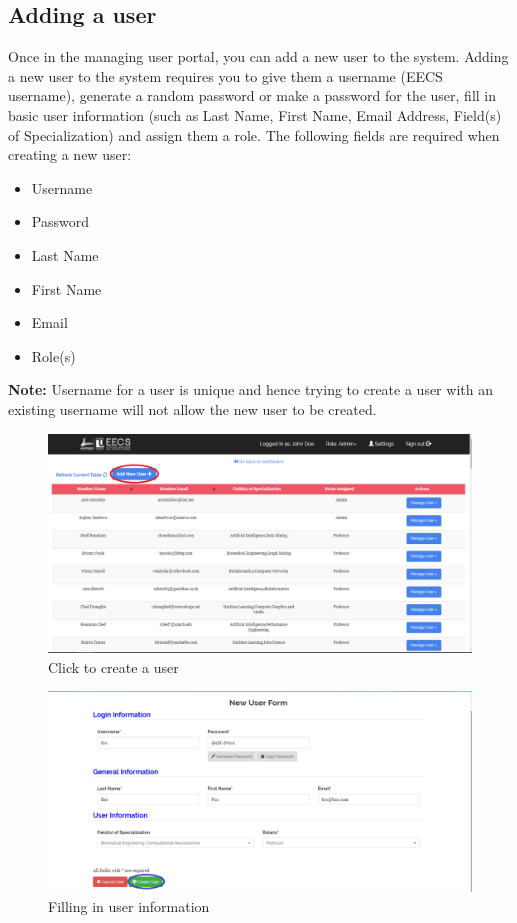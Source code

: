\documentclass[fontsize=12pt,paper=letter,twoside]{scrartcl}
\begin{document}
\subsection{Adding a user}
Once in the managing user portal, you can add a new user to the system. Adding a new user to the system requires you to give them a username (EECS username), generate a random password or make a password for the user, fill in basic user information (such as Last Name, First Name, Email Address, Field(s) of Specialization) and assign them a role. The following fields are required when creating a new user:
\begin{itemize}
\item Username
\item Password
\item Last Name
\item First Name
\item Email
\item Role(s)
\end{itemize}

\smallskip
\noindent \textbf{Note:} Username for a user is unique and hence trying to create a user with an existing username will not allow the new user to be created.

\begin{figure}[!htb]
\begin{center}
\includegraphics[width=.99\textwidth]{images/mu/new_user_click.png}
\end{center}
\caption{Click to create a user}
\label{fig:new_user_click}
\end{figure}

\begin{figure}[!htb]
\begin{center}
\includegraphics[width=.99\textwidth]{images/mu/fill_in_user.png}
\end{center}
\caption{Filling in user information}
\label{fig:fill_in_user}
\end{figure}
\end{document}
